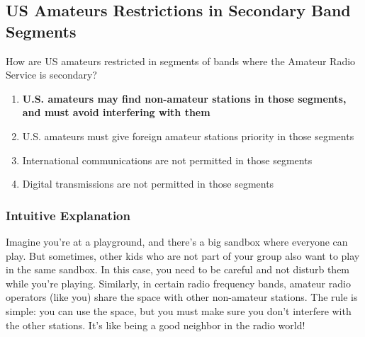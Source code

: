 \subsection{US Amateurs Restrictions in Secondary Band Segments}
\label{T1B08}

\begin{tcolorbox}[colback=gray!10!white,colframe=black!75!black,title=T1B08]
How are US amateurs restricted in segments of bands where the Amateur Radio Service is secondary?
\begin{enumerate}[label=\Alph*)]
    \item \textbf{U.S. amateurs may find non-amateur stations in those segments, and must avoid interfering with them}
    \item U.S. amateurs must give foreign amateur stations priority in those segments
    \item International communications are not permitted in those segments
    \item Digital transmissions are not permitted in those segments
\end{enumerate}
\end{tcolorbox}

\subsubsection{Intuitive Explanation}
Imagine you're at a playground, and there's a big sandbox where everyone can play. But sometimes, other kids who are not part of your group also want to play in the same sandbox. In this case, you need to be careful and not disturb them while you're playing. Similarly, in certain radio frequency bands, amateur radio operators (like you) share the space with other non-amateur stations. The rule is simple: you can use the space, but you must make sure you don't interfere with the other stations. It's like being a good neighbor in the radio world!

